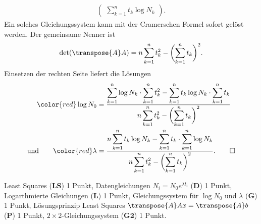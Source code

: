 \begin{loesung}
\begin{align*}
\begin{pmatrix}
\displaystyle \sum_{k=1}^n t_k \log N_k
\end{pmatrix}.
\end{align*}
Ein solches Gleichungssystem kann mit der Cramerschen Formel sofort gelöst
werden.
Der gemeinsame Nenner ist
\[
\det(\transpose{A}A)
=
n\sum_{k=1}^n t_k^2 - \biggl(\sum_{k=1}^n t_k\biggr)^2.
\]
Einsetzen der rechten Seite liefert die Lösungen
\begin{align*}
{\color{red}\log N_0}
&=
\frac{
\displaystyle
\sum_{k=1}^n \log N_k \cdot \sum_{k=1}^n t_k^2
-
\sum_{k=1}^n t_k\log N_k \cdot \sum_{k=1}^n t_k
}{
\displaystyle
n\sum_{k=1}^n t_k^2 - \biggl(\sum_{k=1}^n t_k\biggr)^2}
\\
\text{und}
\qquad
{\color{red}\lambda}
&=
\frac{
\displaystyle
n \sum_{k=1}^n t_k\log N_k
-
\sum_{k=1}^n t_k \cdot \sum_{k=1}^n \log N_k
}{
\displaystyle
n\sum_{k=1}^n t_k^2 - \biggl(\sum_{k=1}^n t_k\biggr)^2}.
\qedhere
\end{align*}
\end{loesung}

\begin{bewertung}
Least Squares ({\bf LS}) 1 Punkt,
Datengleichungen $N_i = N_0e^{\lambda t_i}$ ({\bf D}) 1 Punkt,
Logarthmierte Gleichungen ({\bf L}) 1 Punkt,
Gleichungssystem für $\log N_0$ und $\lambda$ ({\bf G}) 1 Punkt,
Lösungsprinzip Least Squares $\transpose{A}Ax=\transpose{A}b$ ({\bf P}) 1 Punkt,
$2\times 2$-Gleichungssystem ({\bf G2}) 1 Punkt.
\end{bewertung}



